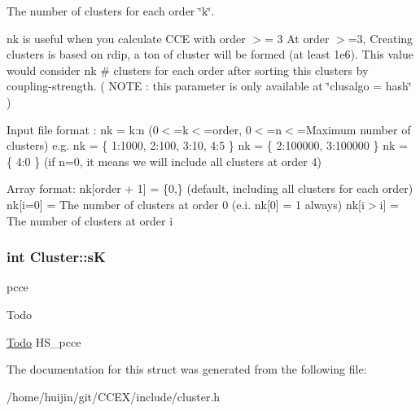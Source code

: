 The number of clusters for each order \char`\"{}k\char`\"{}. 

nk is useful when you calculate C\-C\-E with order $>$= 3 At order $>$=3, Creating clusters is based on rdip, a ton of cluster will be formed (at least 1e6). This value would consider nk \# clusters for each order after sorting this clusters by coupling-\/strength. ( N\-O\-T\-E \-: this parameter is only available at \char`\"{}clusalgo = hash\char`\"{} )

Input file format \-: nk = k\-:n (0$<$=k$<$=order, 0$<$=n$<$=Maximum number of clusters) e.\-g. nk = \{ 1\-:1000, 2\-:100, 3\-:10, 4\-:5 \} nk = \{ 2\-:100000, 3\-:100000 \} nk = \{ 4\-:0 \} (if n=0, it means we will include all clusters at order 4)

Array format\-: nk\mbox{[}order + 1\mbox{]} = \{0,\} (default, including all clusters for each order) nk\mbox{[}i=0\mbox{]} = The number of clusters at order 0 (e.\-i. nk\mbox{[}0\mbox{]} = 1 always) nk\mbox{[}i$>$i\mbox{]} = The number of clusters at order i \hypertarget{structCluster_a7c4d583750b7f37eb2ca537e23ad334f}{
\subsubsection[{s\-K}]{\setlength{\rightskip}{0pt plus 5cm}int Cluster\-::s\-K}}\label{structCluster_a7c4d583750b7f37eb2ca537e23ad334f}
pcce \begin{DoxyRefDesc}{Todo}
\item[\hyperlink{todo__todo000013}{Todo}]H\-S\-\_\-pcce \end{DoxyRefDesc}


The documentation for this struct was generated from the following file\-:\begin{DoxyCompactItemize}
\item 
/home/huijin/git/\-C\-C\-E\-X/include/cluster.\-h\end{DoxyCompactItemize}
